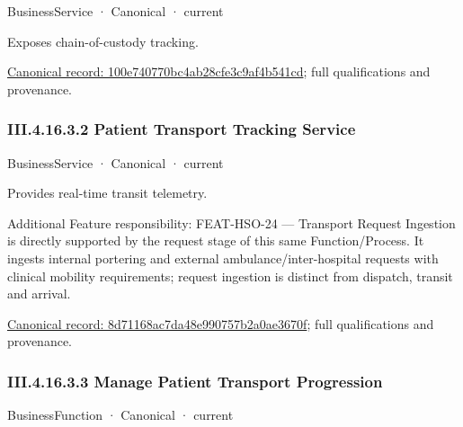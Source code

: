 \label{element:100e740770bc4ab28cfe3c9af4b541cd}
{\small BusinessService · Canonical · current}\par

Exposes chain-of-custody tracking.


{\footnotesize \href{../../../../../../../../continuum/business/business-service/100e740770bc4ab28cfe3c9af4b541cd.md}{Canonical record: 100e740770bc4ab28cfe3c9af4b541cd}; full qualifications and provenance.}\par
\subsubsection*{III.4.16.3.2 Patient Transport Tracking Service}
\label{navigation:III.4.16.3.2}

\label{element:8d71168ac7da48e990757b2a0ae3670f}
{\small BusinessService · Canonical · current}\par

Provides real-time transit telemetry.



Additional Feature responsibility: FEAT-HSO-24 — Transport Request Ingestion is directly supported by the request stage of this same Function/Process. It ingests internal portering and external ambulance/inter-hospital requests with clinical mobility requirements; request ingestion is distinct from dispatch, transit and arrival.


{\footnotesize \href{../../../../../../../../continuum/business/business-service/8d71168ac7da48e990757b2a0ae3670f.md}{Canonical record: 8d71168ac7da48e990757b2a0ae3670f}; full qualifications and provenance.}\par
\subsubsection*{III.4.16.3.3 Manage Patient Transport Progression}
\label{navigation:III.4.16.3.3}

\label{element:8a2136544646458fb60413afed2b66e1}
{\small BusinessFunction · Canonical · current}\par

